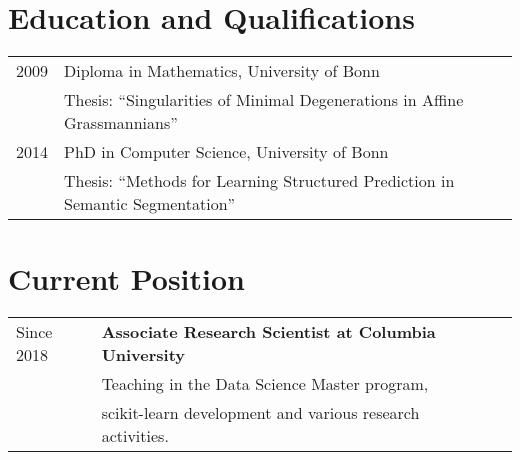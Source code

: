 \documentclass[a4paper,11pt]{article}
\begin{document}
\maketitle

\section{Education and Qualifications}
\begin{tabular}{lll}
    2009 & Diploma in Mathematics,  University of Bonn\\
         & Thesis: ``Singularities of Minimal Degenerations in Affine Grassmannians'' \\
    2014 & PhD in Computer Science, University of Bonn \\
         & Thesis: ``Methods for Learning Structured Prediction in Semantic Segmentation''
\end{tabular}

\section{Current Position}
\begin{tabular}{lll}
    Since 2018 & \textbf{Associate Research Scientist at Columbia University}\\
               & Teaching in the Data Science Master program, \\
               & scikit-learn development and various research activities.
\end{tabular}
\end{document}
